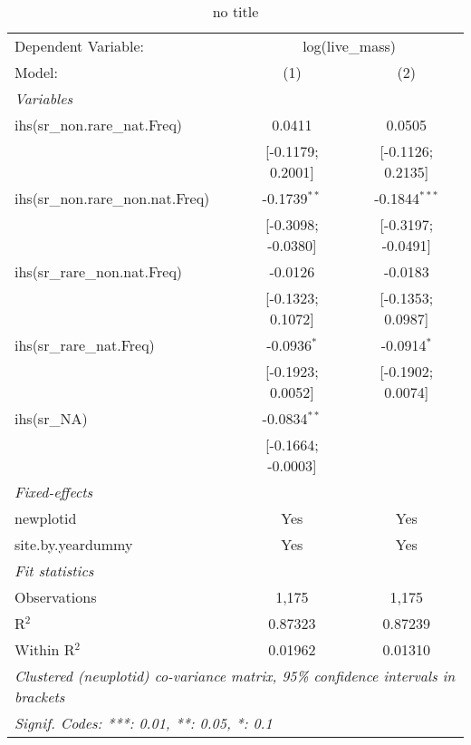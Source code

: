 
\begin{table}[htbp]
   \caption{no title}
   \centering
   \begin{tabular}{lcc}
      \tabularnewline \midrule \midrule
      Dependent Variable: & \multicolumn{2}{c}{log(live\_mass)}\\
      Model:                            & (1)                & (2)\\  
      \midrule
      \emph{Variables}\\
      ihs(sr\_non.rare\_nat.Freq)       & 0.0411             & 0.0505\\   
                                        & [-0.1179; 0.2001]  & [-0.1126; 0.2135]\\   
      ihs(sr\_non.rare\_non.nat.Freq)   & -0.1739$^{**}$     & -0.1844$^{***}$\\   
                                        & [-0.3098; -0.0380] & [-0.3197; -0.0491]\\   
      ihs(sr\_rare\_non.nat.Freq)       & -0.0126            & -0.0183\\   
                                        & [-0.1323; 0.1072]  & [-0.1353; 0.0987]\\   
      ihs(sr\_rare\_nat.Freq)           & -0.0936$^{*}$      & -0.0914$^{*}$\\   
                                        & [-0.1923; 0.0052]  & [-0.1902; 0.0074]\\   
      ihs(sr\_NA)                       & -0.0834$^{**}$     &   \\   
                                        & [-0.1664; -0.0003] &   \\   
      \midrule
      \emph{Fixed-effects}\\
      newplotid                         & Yes                & Yes\\  
      site.by.yeardummy                 & Yes                & Yes\\  
      \midrule
      \emph{Fit statistics}\\
      Observations                      & 1,175              & 1,175\\  
      R$^2$                             & 0.87323            & 0.87239\\  
      Within R$^2$                      & 0.01962            & 0.01310\\  
      \midrule \midrule
      \multicolumn{3}{l}{\emph{Clustered (newplotid) co-variance matrix, 95\% confidence intervals in brackets}}\\
      \multicolumn{3}{l}{\emph{Signif. Codes: ***: 0.01, **: 0.05, *: 0.1}}\\
   \end{tabular}
\end{table}



